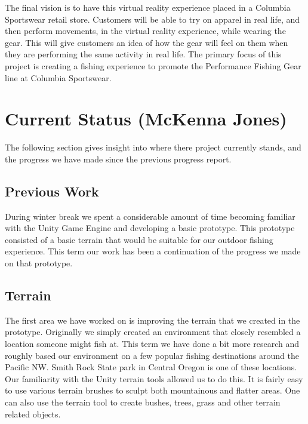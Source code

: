 \documentclass[10pt,journal,compsoc,onecolumn, draftclsnofoot]{IEEEtran}
\begin{document}
The final vision is to have this virtual reality experience placed in a Columbia Sportswear retail store.
Customers will be able to try on apparel in real life, and then perform movements, in the virtual reality experience, while wearing the gear.
This will give customers an idea of how the gear will feel on them when they are performing the same activity in real life.
The primary focus of this project is creating a fishing experience to promote the Performance Fishing Gear line at Columbia Sportswear.

\section{Current Status (McKenna Jones)}
The following section gives insight into where there project currently stands, and the progress we have made since the previous progress report.

\subsection{Previous Work}
During winter break we spent a considerable amount of time becoming familiar with the Unity Game Engine and developing a basic prototype.
This prototype consisted of a basic terrain that would be suitable for our outdoor fishing experience.
This term our work has been a continuation of the progress we made on that prototype.

\subsection{Terrain}
The first area we have worked on is improving the terrain that we created in the prototype.
Originally we simply created an environment that closely resembled a location someone might fish at.
This term we have done a bit more research and roughly based our environment on a few popular fishing destinations around the Pacific NW.
Smith Rock State park in Central Oregon is one of these locations.
Our familiarity with the Unity terrain tools allowed us to do this.
It is fairly easy to use various terrain brushes to sculpt both mountainous and flatter areas.
One can also use the terrain tool to create bushes, trees, grass and other terrain related objects.
\end{document}
